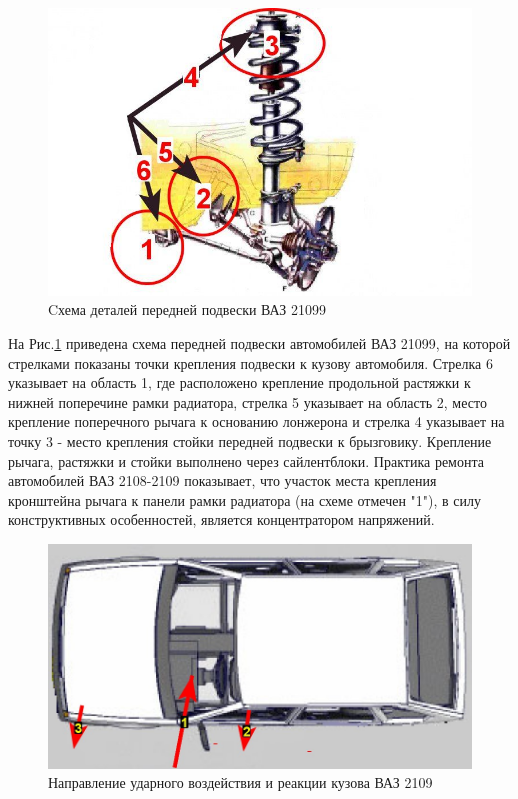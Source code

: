  \begin{figure}[H]
 	\centering
 	\includegraphics[width=0.75\linewidth]{images/s1}
 	\caption{{\footnotesize {Cхема деталей передней подвески ВАЗ 21099}}}
 	\label{ris:images/s1}
 \end{figure}

На Рис.\ref{ris:images/s1} приведена схема передней подвески автомобилей ВАЗ 21099, на которой стрелками показаны точки крепления подвески к кузову автомобиля.  Стрелка 6 указывает на область 1, где расположено крепление продольной растяжки к нижней поперечине рамки радиатора, стрелка 5 указывает на  область 2, место крепление поперечного рычага к основанию лонжерона и стрелка 4 указывает на точку 3 - место крепления стойки передней подвески к брызговику. Крепление рычага, растяжки и стойки выполнено через сайлентблоки. Практика ремонта автомобилей ВАЗ 2108-2109 показывает, что участок места крепления кронштейна рычага к панели рамки радиатора (на схеме отмечен "1"), в силу конструктивных особенностей, является  концентратором напряжений. 

 \begin{figure}[H]
	\centering
	\includegraphics[width=0.75\linewidth]{images/s2}
	\caption{{\footnotesize {Направление   ударного воздействия  и реакции кузова ВАЗ 2109}}}
	\label{ris:images/s2}
\end{figure}

